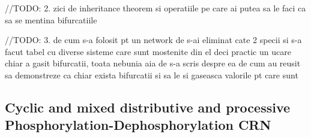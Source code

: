 \hfill\break
//TODO: 2. zici de inheritance theorem si operatiile pe care ai putea sa le faci ca sa se mentina bifurcatiile
\hfill\break

\hfill\break
//TODO: 3. de cum s-a folosit pt un network de s-ai eliminat cate 2 specii si s-a facut tabel cu diverse sisteme care sunt mostenite din el
deci practic un ucare chiar a gasit bifurcatii, toata nebunia aia de s-a scris despre ea de cum au reusit sa demonstreze ca chiar exista bifurcatii si sa le si gaseasca valorile pt care sunt
\hfill\break

\subsection{Cyclic and mixed distributive and processive Phosphorylation-Dephosphorylation CRN}
